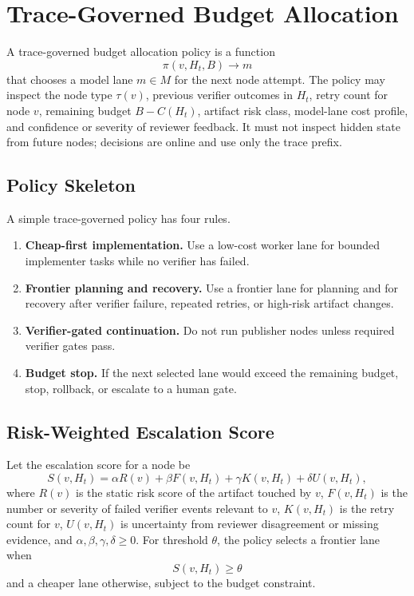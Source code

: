 \documentclass[11pt]{article}
\begin{document}
\section{Trace-Governed Budget Allocation}

A trace-governed budget allocation policy is a function
\[
\pi(v,H_t,B)\rightarrow m
\]
that chooses a model lane $m\in M$ for the next node attempt. The policy may
inspect the node type $\tau(v)$, previous verifier outcomes in $H_t$, retry
count for node $v$, remaining budget $B-C(H_t)$, artifact risk class,
model-lane cost profile, and confidence or severity of reviewer feedback. It
must not inspect hidden state from future nodes; decisions are online and use
only the trace prefix.

\subsection{Policy Skeleton}

A simple trace-governed policy has four rules.

\begin{enumerate}
  \item \textbf{Cheap-first implementation.} Use a low-cost worker lane for
  bounded implementer tasks while no verifier has failed.
  \item \textbf{Frontier planning and recovery.} Use a frontier lane for
  planning and for recovery after verifier failure, repeated retries, or
  high-risk artifact changes.
  \item \textbf{Verifier-gated continuation.} Do not run publisher nodes unless
  required verifier gates pass.
  \item \textbf{Budget stop.} If the next selected lane would exceed the
  remaining budget, stop, rollback, or escalate to a human gate.
\end{enumerate}

\subsection{Risk-Weighted Escalation Score}

Let the escalation score for a node be
\[
S(v,H_t)=\alpha R(v)+\beta F(v,H_t)+\gamma K(v,H_t)+\delta U(v,H_t),
\]
where $R(v)$ is the static risk score of the artifact touched by $v$,
$F(v,H_t)$ is the number or severity of failed verifier events relevant to
$v$, $K(v,H_t)$ is the retry count for $v$, $U(v,H_t)$ is uncertainty from
reviewer disagreement or missing evidence, and
$\alpha,\beta,\gamma,\delta\ge 0$. For threshold $\theta$, the policy selects a
frontier lane when
\[
S(v,H_t)\ge\theta
\]
and a cheaper lane otherwise, subject to the budget constraint.
\end{document}
